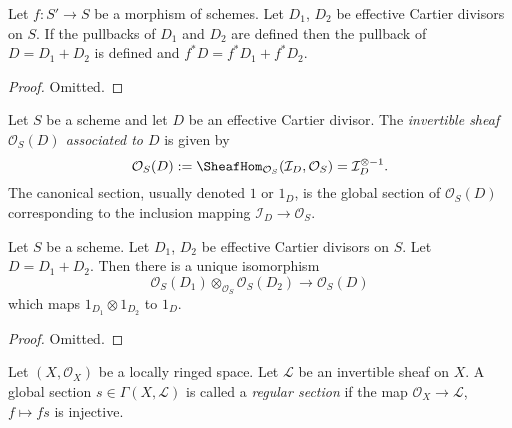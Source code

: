 \begin{lemma}
\label{lemma-pullback-effective-Cartier-divisors-additive}
Let $f : S' \to S$ be a morphism of schemes.
Let $D_1$, $D_2$ be effective Cartier divisors on $S$.
If the pullbacks of $D_1$ and $D_2$ are defined then the
pullback of $D = D_1 + D_2$ is defined and
$f^*D = f^*D_1 + f^*D_2$.
\end{lemma}

\begin{proof}
Omitted.
\end{proof}

\begin{definition}
\label{definition-invertible-sheaf-effective-Cartier-divisor}
Let $S$ be a scheme and let $D$ be an effective Cartier divisor.
The {\it invertible sheaf $\mathcal{O}_S(D)$ associated to $D$}
is given by
$$
\mathcal{O}_S(D) :=
\SheafHom_{\mathcal{O}_S}(\mathcal{I}_D, \mathcal{O}_S) =
\mathcal{I}_D^{\otimes -1}.
$$
The canonical section, usually denoted $1$ or $1_D$, is the
global section of $\mathcal{O}_S(D)$ corresponding to
the inclusion mapping $\mathcal{I}_D \to \mathcal{O}_S$.
\end{definition}

\begin{lemma}
\label{lemma-invertible-sheaf-sum-effective-Cartier-divisors}
Let $S$ be a scheme.
Let $D_1$, $D_2$ be effective Cartier divisors on $S$.
Let $D = D_1 + D_2$.
Then there is a unique isomorphism
$$
\mathcal{O}_S(D_1) \otimes_{\mathcal{O}_S} \mathcal{O}_S(D_2)
\longrightarrow
\mathcal{O}_S(D)
$$
which maps $1_{D_1} \otimes 1_{D_2}$ to $1_D$.
\end{lemma}

\begin{proof}
Omitted.
\end{proof}

\begin{definition}
\label{definition-regular-section}
Let $(X, \mathcal{O}_X)$ be a locally ringed space.
Let $\mathcal{L}$ be an invertible sheaf on $X$.
A global section $s \in \Gamma(X, \mathcal{L})$ is called a
{\it regular section} if the map $\mathcal{O}_X \to \mathcal{L}$,
$f \mapsto fs$ is injective.
\end{definition}

